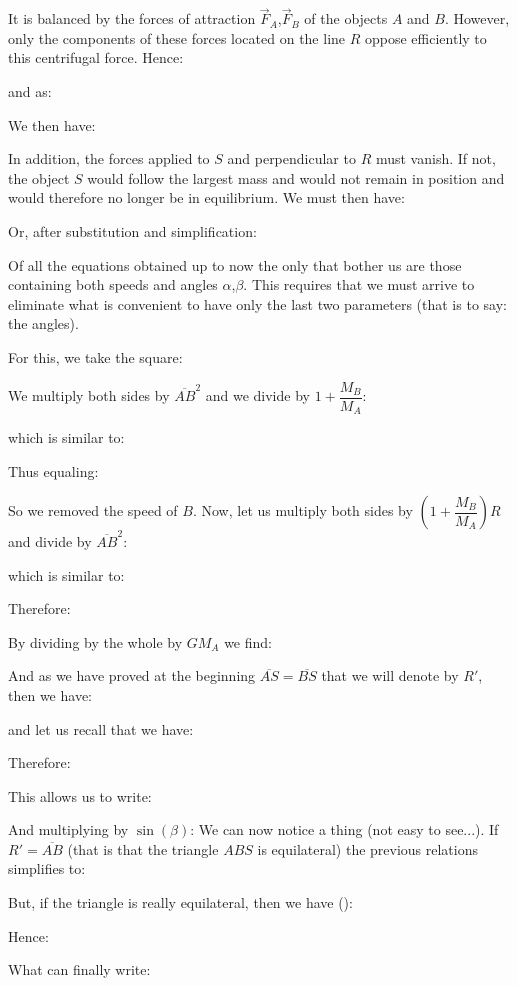 	It is balanced by the forces of attraction $\vec{F}_A$,$\vec{F}_B$ of the objects $A$ and $B$. However, only the components of these forces located on the line $R$ oppose efficiently to this centrifugal force. Hence:
	
	
	and as:
	
	We then have:
	
	In addition, the forces applied to $S$ and perpendicular to $R$ must vanish. If not, the object $S$ would follow the largest mass and would not remain in position and would therefore no longer be in equilibrium. We must then have:
	
	Or, after substitution and simplification:
	
	Of all the equations obtained up to now the only that bother us are those containing both speeds and angles $\alpha$,$\beta$. This requires that we must arrive to eliminate what is convenient to have only the last two parameters (that is to say: the angles).

	For this, we take the square:
	
	We multiply both sides by $\overline{AB}^2$ and we divide by $1+\dfrac{M_B}{M_A}$:
	
	which is similar to:
	
	Thus equaling:
	
	So we removed the speed of $B$. Now, let us multiply both sides by $\left(1+\dfrac{M_B}{M_A}\right)R$ and divide by $\overline{AB}^2$:
	
	which is similar to:
	
	Therefore:
	
	By dividing by the whole by $GM_A$ we find:
	
	And as we have proved at the beginning $\overline{AS}=\overline{BS}$ that we will denote by $R'$, then we have:
	
	and let us recall that we have:
	
	Therefore:
	
	This allows us to write:
	
	And multiplying by $\sin(\beta)$:
	We can now notice a thing (not easy to see...). If $R'=\overline{AB}$ (that is that the triangle $ABS$ is equilateral) the previous relations simplifies to:
	
	But, if the triangle is really equilateral, then we have ():
	
	Hence:
	
	What can finally write:
	
